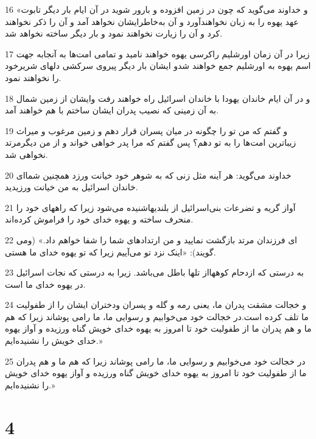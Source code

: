 \par 16 «و خداوند می‌گوید که چون در زمین افزوده و بارور شوید در آن ایام بار دیگر تابوت عهد یهوه را به زبان نخواهند‌آورد و آن به‌خاطرایشان نخواهد آمد و آن را ذکر نخواهند کرد و آن را زیارت نخواهند نمود و بار دیگر ساخته نخواهد شد.
\par 17 زیرا در آن زمان اورشلیم راکرسی یهوه خواهند نامید و تمامی امت‌ها به آنجابه جهت اسم یهوه به اورشلیم جمع خواهند شدو ایشان بار دیگر پیروی سرکشی دلهای شریرخود را نخواهند نمود.
\par 18 و در آن ایام خاندان یهودا با خاندان اسرائیل راه خواهند رفت وایشان از زمین شمال به آن زمینی که نصیب پدران ایشان ساختم با هم خواهند آمد.
\par 19 و گفتم که من تو را چگونه در میان پسران قرار دهم و زمین مرغوب و میراث زیباترین امت‌ها را به تو دهم؟ پس گفتم که مرا پدر خواهی خواند و از من دیگرمرتد نخواهی شد. 
\par 20 خداوند می‌گوید: هر آینه مثل زنی که به شوهر خود خیانت ورزد همچنین شما‌ای خاندان اسرائیل به من خیانت ورزیدید.
\par 21 آواز گریه و تضرعات بنی‌اسرائیل از بلندیهاشنیده می‌شود زیرا که راههای خود را منحرف ساخته و یهوه خدای خود را فراموش کرده‌اند.
\par 22 ‌ای فرزندان مرتد بازگشت نمایید و من ارتدادهای شما را شفا خواهم داد.» (ومی گویند): «اینک نزد تو می‌آییم زیرا که تو یهوه خدای ما هستی.
\par 23 به درستی که ازدحام کوههااز تلها باطل می‌باشد. زیرا به درستی که نجات اسرائیل در یهوه خدای ما است.
\par 24 و خجالت مشقت پدران ما، یعنی رمه و گله و پسران ودختران ایشان را از طفولیت ما تلف کرده است.در خجالت خود می‌خوابیم و رسوایی ما، ما رامی پوشاند زیرا که هم ما و هم پدران ما از طفولیت خود تا امروز به یهوه خدای خویش گناه ورزیده و آواز یهوه خدای خویش را نشنیده‌ایم.»
\par 25 در خجالت خود می‌خوابیم و رسوایی ما، ما رامی پوشاند زیرا که هم ما و هم پدران ما از طفولیت خود تا امروز به یهوه خدای خویش گناه ورزیده و آواز یهوه خدای خویش را نشنیده‌ایم.»
 
\chapter{4}


